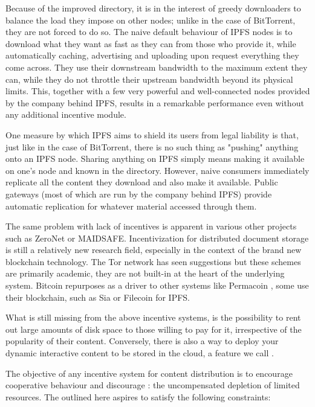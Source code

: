 Because of the improved directory, it is in the interest of greedy downloaders to balance the load they impose on other nodes; unlike in the case of BitTorrent, they are not forced to do so. The naive default behaviour of IPFS nodes is to download what they want as fast as they can from those who provide it, while automatically caching, advertising and uploading upon request everything they come across. They use their downstream bandwidth to the maximum extent they can, while they do not throttle their upstream bandwidth beyond its physical limits. This, together with a few very powerful and well-connected nodes provided by the company behind IPFS, results in a remarkable performance even without any additional incentive module.


One measure by which IPFS aims to shield its users from legal liability is that, just like in the case of BitTorrent, there is no such thing as "pushing" anything onto an IPFS node. Sharing anything on IPFS simply means making it available on one's node and known in the directory. However, naive consumers immediately replicate all the content they download and also make it available. Public  gateways (most of which are run by the company behind IPFS) provide automatic replication for whatever material accessed through them.

The same problem with lack of incentives is apparent in various other projects such as ZeroNet or MAIDSAFE. Incentivization for distributed document storage is still a relatively new research field, especially in the context of the brand new blockchain technology. The Tor network has seen suggestions \cite{jansen2014onions,hoshetal2014tor} but these schemes are primarily academic, they are not built-in at the heart of the underlying system. Bitcoin repurposes as a driver to other systems like Permacoin \cite{miller2014permacoin}, some use their blockchain, such as Sia \cite{vorick2014sia} or Filecoin \cite{filecoin2014} for IPFS.

What is still missing from the above incentive systems, is the possibility to rent out large amounts of disk space to those willing to pay for it, irrespective of the popularity of their content. Conversely, there is also a way to deploy your dynamic interactive content to be stored in the cloud, a feature we call .

The objective of any incentive system for  content distribution is to encourage cooperative behaviour and discourage : the uncompensated depletion of limited resources. The  outlined here aspires to satisfy the following constraints:

